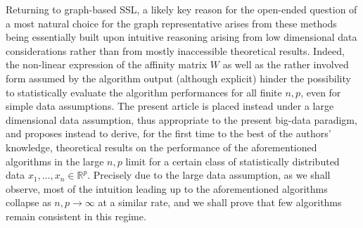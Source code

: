 \documentclass[twoside,11pt]{article}
\begin{document}
\medskip

Returning to graph-based SSL, a likely key reason for the open-ended question of a most natural choice for the graph representative arises from these methods being essentially built upon intuitive reasoning arising from low dimensional data considerations rather than from mostly inaccessible theoretical results. Indeed, the non-linear expression of the affinity matrix $W$ as well as the rather involved form assumed by the algorithm output (although explicit) hinder the possibility to statistically evaluate the algorithm performances for all finite $n,p$, even for simple data assumptions. The present article is placed instead under a large dimensional data assumption, thus appropriate to the present big-data paradigm, and proposes instead to derive, for the first time to the best of the authors' knowledge, theoretical results on the performance of the aforementioned algorithms in the large $n,p$ limit for a certain class of statistically distributed data $x_1,\ldots,x_n\in\mathbb{R}^p$. Precisely due to the large data assumption, as we shall observe, most of the intuition leading up to the aforementioned algorithms collapse as $n,p\to\infty$ at a similar rate, and we shall prove that few algorithms remain consistent in this regime.
\end{document}
